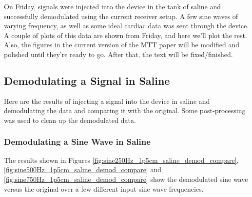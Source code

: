 \documentclass[12pt,onecolumn,titlepage]{article}
\begin{document}
\indent \indent On Friday, signals were injected into the device in the tank of saline and successfully demodulated using the current receiver setup. A few sine waves of varying frequency, as well as some ideal cardiac data was sent through the device. A couple of plots of this data are shown from Friday, and here we'll plot the rest. Also, the figures in the current version of the MTT paper will be modified and polished until they're ready to go. After that, the text will be fixed/finished.

\subsection{Demodulating a Signal in Saline}
\indent \indent Here are the results of injecting a signal into the device in saline and demodulating the data and comparing it with the original. Some post-processing was used to clean up the demodulated data.

\subsubsection{Demodulating a Sine Wave in Saline}
\indent \indent The results shown in Figures \ref{fig:sine250Hz_1p5cm_saline_demod_compare}, \ref{fig:sine500Hz_1p5cm_saline_demod_compare} and \ref{fig:sine750Hz_1p5cm_saline_demod_compare} show the demodulated sine wave versus the original over a few different input sine wave frequencies. 
\end{document}
